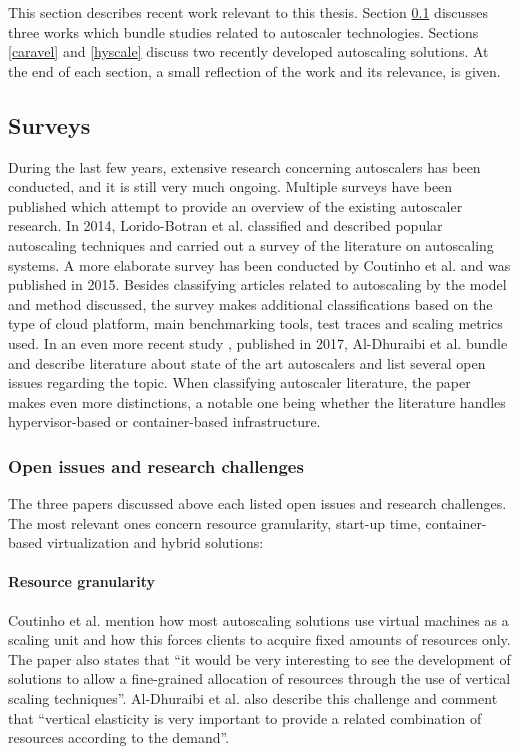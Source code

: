 This section describes recent work relevant to this thesis. Section \ref{surveys} discusses three works which bundle studies related to autoscaler technologies. Sections \ref{caravel} and \ref{hyscale} discuss two recently developed autoscaling solutions. At the end of each section, a small reflection of the work and its relevance, is given.

\subsection{Surveys}
\label{surveys}
During the last few years, extensive research concerning autoscalers has been
conducted, and it is still very much ongoing. Multiple surveys have been published which attempt to provide an overview of the existing autoscaler research. In 2014, Lorido-Botran et al. \citep{Lorido-BotranTania2014ARoA} classified and described popular autoscaling techniques and carried out a survey of the literature on autoscaling systems.\newline
A more elaborate survey has been conducted by Coutinho et al. \citep{CoutinhoEmanuel2015Eicc} and was published in 2015. Besides classifying articles related to autoscaling by the model and method discussed, the survey makes additional classifications based on the type of cloud platform, main benchmarking tools, test traces and scaling metrics used.\newline
In an even more recent study \citep{Al-DhuraibiYahya2018EiCC}, published in 2017, Al-Dhuraibi et al. bundle and describe literature about state of the art autoscalers and list several open
issues regarding the topic. When classifying autoscaler literature, the paper makes even more distinctions, a notable one being whether the literature handles hypervisor-based or container-based infrastructure.

\subsubsection{Open issues and research challenges}
The three papers discussed above each listed open issues and research challenges.
The most relevant ones concern resource granularity, start-up time, container-based virtualization and hybrid solutions:

\paragraph{Resource granularity} Coutinho et al. mention how most autoscaling solutions use virtual machines as a scaling unit and how this forces clients to acquire fixed amounts of resources only. The paper also states that ``it would be very interesting to see the development of solutions to allow a fine-grained allocation of resources through the use of vertical scaling techniques''. Al-Dhuraibi et al. also describe this challenge and comment that ``vertical elasticity is very important to provide a related combination of resources according to the demand''. \citep{CoutinhoEmanuel2015Eicc} \citep{Al-DhuraibiYahya2018EiCC}

